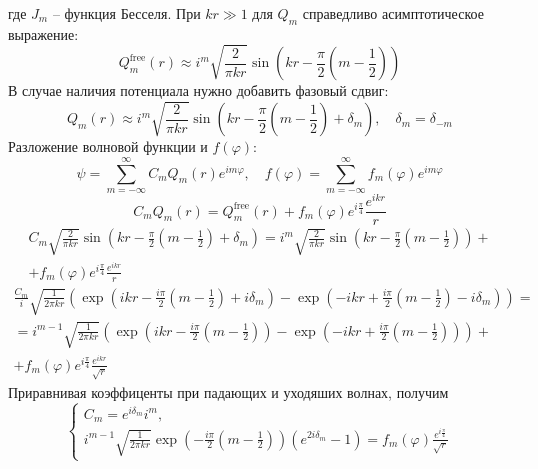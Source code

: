 \documentclass[12pt]{article}
\theoremstyle{definition}
\begin{document}
где $J_m$ -- функция Бесселя. При $kr\gg1$ для $Q_m$ справедливо асимптотическое выражение:
\begin{equation}
    Q^\text{free}_m(r)\approx i^m\sqrt{\frac{2}{\pi kr}}\sin\left(kr-\frac{\pi}{2}\left(m-\frac{1}{2}\right)\right)
\end{equation}
В случае наличия потенциала нужно добавить фазовый сдвиг:
\begin{equation}
    Q_m(r)\approx i^m\sqrt{\frac{2}{\pi kr}}\sin\left(kr-\frac{\pi}{2}\left(m-\frac{1}{2}\right)+\delta_m\right),\quad \delta_m=\delta_{-m}
\end{equation}
Разложение волновой функции и $f(\varphi)$:
\begin{equation}
    \psi=\sum\limits_{m=-\infty}^\infty C_mQ_m(r)e^{im\varphi},\quad f(\varphi)=\sum\limits_{m=-\infty}^\infty f_m(\varphi)e^{im\varphi}
\end{equation}
\begin{equation}
    C_mQ_m(r)=Q^\text{free}_m(r)+f_m(\varphi)e^{i\frac{\pi}{4}}\frac{e^{ikr}}{r}
\end{equation}
\begin{multline}
    C_m\sqrt{\frac{2}{\pi kr}}\sin\left(kr-\frac{\pi}{2}\left(m-\frac{1}{2}\right)+\delta_m\right)=i^m\sqrt{\frac{2}{\pi kr}}\sin\left(kr-\frac{\pi}{2}\left(m-\frac{1}{2}\right)\right)+\\+f_m(\varphi)e^{i\frac{\pi}{4}}\frac{e^{ikr}}{r}
\end{multline}
\begin{multline}
    \frac{C_m}{i}\sqrt{\frac{1}{2\pi kr}}\left(\exp\left(ikr-\frac{i\pi}{2}\left(m-\frac{1}{2}\right)+i\delta_m\right)-\exp\left(-ikr+\frac{i\pi}{2}\left(m-\frac{1}{2}\right)-i\delta_m\right)\right)=\\=i^{m-1}\sqrt{\frac{1}{2\pi kr}}\left(\exp\left(ikr-\frac{i\pi}{2}\left(m-\frac{1}{2}\right)\right)-\exp\left(-ikr+\frac{i\pi}{2}\left(m-\frac{1}{2}\right)\right)\right)+\\+f_m(\varphi)e^{i\frac{\pi}{4}}\frac{e^{ikr}}{\sqrt{r}}
\end{multline}
Приравнивая коэффиценты при падающих и уходяших волнах, получим
\begin{equation}
    \begin{cases}
        C_m=e^{i\delta_m}i^m,\\
        i^{m-1}\sqrt{\frac{1}{2\pi kr}}\exp\left(-\frac{i\pi}{2}\left(m-\frac{1}{2}\right)\right)(e^{2i\delta_m}-1)=f_m(\varphi)\frac{e^{i\frac{\pi}{4}}}{\sqrt{r}}
    \end{cases}
\end{equation}
\end{document}
